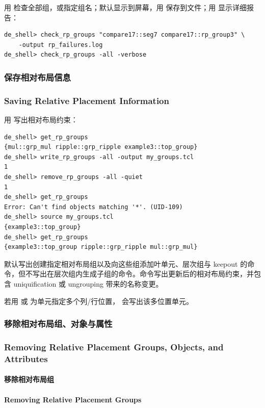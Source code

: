 用  检查全部组，或指定组名；默认显示到屏幕，用  保存到文件；用  显示详细报告：
\begin{lstlisting}
de_shell> check_rp_groups "compare17::seg7 compare17::rp_group3" \
    -output rp_failures.log
de_shell> check_rp_groups -all -verbose
\end{lstlisting}

\subsubsection{保存相对布局信息}
\subsubsection*{Saving Relative Placement Information}

用  写出相对布局约束：
\begin{lstlisting}
de_shell> get_rp_groups
{mul::grp_mul ripple::grp_ripple example3::top_group}
de_shell> write_rp_groups -all -output my_groups.tcl
1
de_shell> remove_rp_groups -all -quiet
1
de_shell> get_rp_groups
Error: Can't find objects matching '*'. (UID-109)
de_shell> source my_groups.tcl
{example3::top_group}
de_shell> get_rp_groups
{example3::top_group ripple::grp_ripple mul::grp_mul}
\end{lstlisting}

默认写出创建指定相对布局组以及向这些组添加叶单元、层次组与 keepout 的命令，但不写出在层次组内生成子组的命令。命令写出更新后的相对布局约束，并包含 uniquification 或 ungrouping 带来的名称变更。

若用  或  为单元指定多个列/行位置， 会写出该多位置单元。

\subsubsection{移除相对布局组、对象与属性}
\subsubsection*{Removing Relative Placement Groups, Objects, and Attributes}

\paragraph{移除相对布局组}
\paragraph*{Removing Relative Placement Groups}

